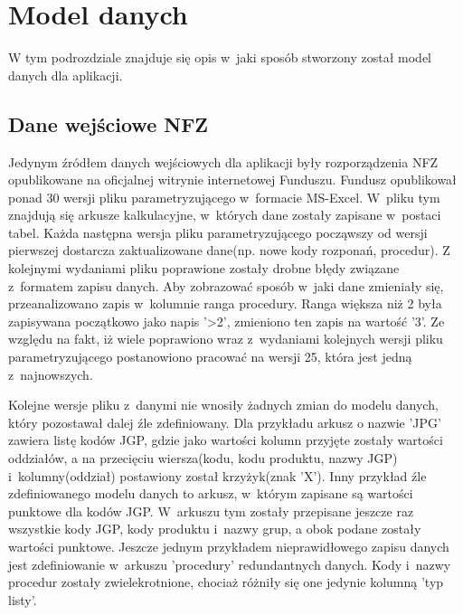 \section{Model danych}
\label{sec:modelDanych}

W tym podrozdziale znajduje się opis w~jaki sposób stworzony został model danych dla aplikacji.

\subsection{Dane wejściowe NFZ}
\label{sec:daneWejscioweNFZ}
Jedynym źródłem danych wejściowych dla aplikacji były rozporządzenia NFZ opublikowane na oficjalnej witrynie internetowej Funduszu\cite{rozporzadzenia_nfz}. Fundusz opublikował ponad 30 wersji pliku parametryzującego w~formacie MS-Excel. W~pliku tym znajdują się arkusze kalkulacyjne, w~których dane zostały zapisane w~postaci tabel. Każda następna wersja pliku parametryzującego począwszy od wersji pierwszej dostarcza zaktualizowane dane(np. nowe kody rozponań, procedur). Z kolejnymi wydaniami pliku poprawione zostały drobne błędy związane z~formatem zapisu danych. Aby zobrazować sposób w~jaki dane zmieniały się, przeanalizowano zapis w~kolumnie ranga procedury. Ranga większa niż 2 była zapisywana początkowo jako napis '>2', zmieniono ten zapis na wartość '3'. Ze względu na fakt, iż wiele poprawiono wraz z~wydaniami kolejnych wersji pliku parametryzującego postanowiono pracować na wersji 25, która jest jedną z~najnowszych. 

Kolejne wersje pliku z~danymi nie wnosiły żadnych zmian do modelu danych, który pozostawał dalej źle zdefiniowany. Dla przykładu arkusz o nazwie 'JPG' zawiera listę kodów JGP, gdzie jako wartości kolumn przyjęte zostały wartości oddziałów, a na przecięciu wiersza(kodu, kodu produktu, nazwy JGP) i~kolumny(oddział) postawiony został krzyżyk(znak 'X'). Inny przykład źle zdefiniowanego modelu danych to arkusz, w~którym zapisane są wartości punktowe dla kodów JGP. W~arkuszu tym zostały przepisane jeszcze raz wszystkie kody JGP, kody produktu i~nazwy grup, a obok podane zostały wartości punktowe. Jeszcze jednym przykładem nieprawidłowego zapisu danych jest zdefiniowanie w~arkuszu 'procedury' redundantnych danych. Kody i~nazwy procedur zostały zwielekrotnione, chociaż różniły się one jedynie kolumną 'typ listy'.


